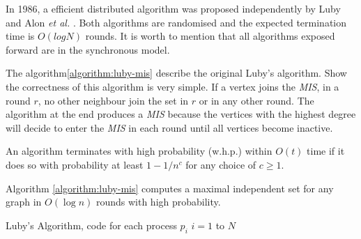 In 1986, a efficient distributed algorithm was proposed independently by Luby \cite{luby1986simple} and Alon \textit{et al.} \cite{alon1986fast}. Both algorithms are randomised and the expected termination time is $O(log N)$ rounds. It is worth to mention that all algorithms exposed forward are in the synchronous model.  

The algorithm\ref{algorithm:luby-mis} describe the original Luby's algorithm. Show the correctness of this algorithm is very simple. If a vertex joins the \textit{MIS}, in a round $r$, no other neighbour join the set in $r$ or in any other round. The algorithm at the end produces a \textit{MIS} because the vertices with the highest degree will decide to enter the \textit{MIS} in each round until all vertices become inactive.

\begin{definition}

An algorithm terminates with high probability (w.h.p.) within $O(t)$ time if it does so with probability at least $1 − 1/n^c$ for any choice of $c ≥ 1$.

\end{definition}


\begin{theorem}

Algorithm \ref{algorithm:luby-mis} computes a maximal independent set for any graph  in $O(\log n)$  rounds with high probability.

\end{theorem}


\begin{algorithm}
 \caption{Luby's Algorithm, code for each process $p_i$ $i = 1$ to $N$}
 \label{algorithm:luby-mis} 

\SetAlgoNoLine
{}
\end{algorithm} 




